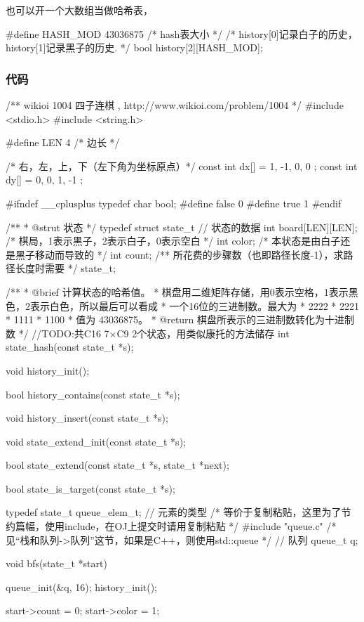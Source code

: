 也可以开一个大数组当做哈希表，
\begin{Code}
#define HASH_MOD 43036875 /* hash表大小 */
/* history[0]记录白子的历史，history[1]记录黑子的历史. */
bool history[2][HASH_MOD];
\end{Code}

\subsubsection{代码}
\begin{Codex}[label=four_adjacent.c]
/** wikioi 1004 四子连棋  , http://www.wikioi.com/problem/1004 */
#include <stdio.h>
#include <string.h>

#define LEN 4   /* 边长 */

/* 右，左，上，下（左下角为坐标原点）*/
const int dx[] = { 1, -1, 0, 0 };
const int dy[] = { 0, 0, 1, -1 };


#ifndef __cplusplus
typedef char bool;
#define false 0
#define true 1
#endif

/**
 * @strut 状态
 */
typedef struct state_t {
    // 状态的数据
    int board[LEN][LEN]; /* 棋局，1表示黑子，2表示白子，0表示空白 */
    int color; /* 本状态是由白子还是黑子移动而导致的 */
    int count;  /** 所花费的步骤数（也即路径长度-1），求路径长度时需要 */
} state_t;

/**
 * @brief 计算状态的哈希值。
 * 棋盘用二维矩阵存储，用0表示空格，1表示黑色，2表示白色，所以最后可以看成
 * 一个16位的三进制数。最大为
 * 2222
 * 2221
 * 1111
 * 1100
 * 值为 43036875。
 * @return 棋盘所表示的三进制数转化为十进制数
 */
//TODO:共C16 7×C9 2个状态，用类似康托的方法储存
int state_hash(const state_t *s);

void history_init();

bool history_contains(const state_t *s);

void history_insert(const state_t *s);

void state_extend_init(const state_t *s);

bool state_extend(const state_t *s, state_t *next);

bool state_is_target(const state_t *s);

typedef state_t queue_elem_t; // 元素的类型
/* 等价于复制粘贴，这里为了节约篇幅，使用include，在OJ上提交时请用复制粘贴 */
#include "queue.c"  /* 见“栈和队列->队列”这节，如果是C++，则使用std::queue */
// 队列
queue_t q;

void bfs(state_t *start) {
    queue_init(&q, 16);
    history_init();

    start->count = 0;
    start->color = 1;

}
\end{Codex}
